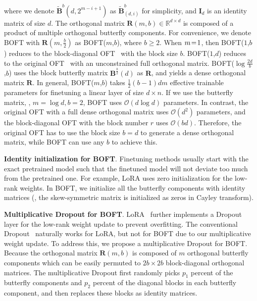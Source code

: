 where we denote $\tilde{\bm{B}}^b(d,2^{m - i+1})$ as $\tilde{\bm{B}}^b_{(d,i)}$ for simplicity, and $\bm{I}_d$ is an identity matrix of size $d$. The orthogonal matrix $\bm{R}(m,b)\in\mathbb{R}^{d\times d}$ is composed of a product of multiple orthogonal butterfly components. For convenience, we denote BOFT with $\bm{R}(m,\frac{b}{2})$ as BOFT($m$,$b$), where $b\geq 2$. When $\thickmuskip=2mu \medmuskip=2mu m=1$, then BOFT($1$,$b$) reduces to the block-diagonal OFT~\cite{qiu2023controlling} with the block size $b$. BOFT($1$,$d$) reduces to the original OFT~\cite{qiu2023controlling} with an unconstrained full orthogonal matrix. BOFT($\log \frac{2d}{b}$,$b$) uses the block butterfly matrix $\bm{B}^{\frac{b}{2}}(d)$ as $\bm{R}$, and yields a dense orthogonal matrix $\bm{R}$. In general, BOFT($m$,$b$) takes $\frac{1}{2}(b-1)dm$ effective trainable parameters for finetuning a linear layer of size $d\times n$. If we use the butterfly matrix, \ie, $m=\log d,b=2$, BOFT uses $\mathcal{O}(d\log d)$ parameters. In contrast, the original OFT with a full dense orthogonal matrix uses $\mathcal{O}(d^2)$ parameters, and the block-diagonal OFT with the block number $r$ uses $\mathcal{O}(bd)$. Therefore, the original OFT has to use the block size $b=d$ to generate a dense orthogonal matrix, while BOFT can use any $b$ to achieve this.

\newpage


\textbf{Identity initialization for BOFT}. Finetuning methods usually start with the exact pretrained model such that the finetuned model will not deviate too much from the pretrained one. 
For example, LoRA uses zero initialization for the low-rank weights. 
In BOFT, we initialize all the butterfly components with identity matrices (\ie, the skew-symmetric matrix is initialized as zeros in Cayley transform).

\textbf{Multiplicative Dropout for BOFT}. LoRA~\cite{hulora2022} further implements a Dropout layer for the low-rank weight update to prevent overfitting. The conventional Dropout~\cite{srivastava2014dropout} naturally works for LoRA, but not for BOFT due to our multiplicative weight update. To address this, we propose a multiplicative Dropout for BOFT. Because the orthogonal matrix $\bm{R}(m,b)$ is composed of $m$ orthogonal butterfly components which can be easily permuted to $2b\times 2b$ block-diagonal orthogonal matrices. The multiplicative Dropout first randomly picks $p_1$ percent of the butterfly components and $p_2$ percent of the diagonal blocks in each butterfly component, and then replaces these blocks as identity matrices.

